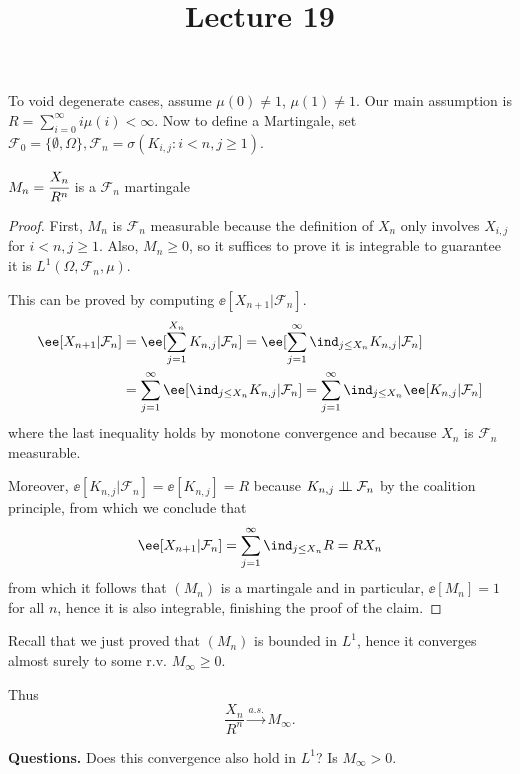 \documentclass[../main.tex]{subfiles}
\title{Lecture 19}
\begin{document}
\vspace{0.5em}
  To void degenerate cases, assume $\mu(0) \neq 1$, $\mu(1) \neq 1$. 
  Our main assumption is $R = \sum_{i=0}^\infty i\mu(i) < \infty$. 
  Now to define a Martingale, set $\mathcal{F}_0 = \{ \emptyset, \Omega \},
  \mathcal{F}_n = \sigma(K_{i,j} \colon i < n, j \geq 1)$.

  \begin{claim}
    $M_n = \cfrac{X_n}{R^n}$ is a $\mathcal{F}_n$ martingale
  \end{claim}
  \begin{proof}
      First, $M_n$ is $\mathcal{F}_n$ measurable because the definition of $X_n$
      only involves $X_{i, j}$ for $i < n, j \geq 1$. Also, $M_n \geq 0$, so it
      suffices to prove it is integrable to guarantee it is $L^1(\Omega,
      \mathcal{F}_n, \mu)$.

      This can be proved by computing $\ee[X_{n+1} | \mathcal{F}_n]$.
      \begin{align*}
        \ee[X_{n+1} | \mathcal{F}_n] &= \ee[\sum_{j=1}^{X_n} K_{n, j} |
      \mathcal{F}_n] = \ee[\sum_{j=1}^\infty \ind_{j \leq X_n} K_{n, j} |
      \mathcal{F}_n] \\
        &= \sum_{j=1}^\infty \ee[\ind_{j \leq X_n} K_{n, j} | \mathcal{F}_n]
        = \sum_{j=1}^{\infty} \ind_{j \leq X_n} \ee[K_{n, j} | \mathcal{F}_n]
      \end{align*}
      where the last inequality holds by monotone convergence and because $X_n$
      is $\mathcal{F}_n$ measurable.

      Moreover, $\ee[K_{n, j} | \mathcal{F}_n] = \ee[K_{n, j}] = R$ because
      $K_{n, j} \perp\!\!\!\!\,\perp \mathcal{F}_n$ by the coalition principle, from which we
      conclude that 
      \[
        \ee[X_{n+1} | \mathcal{F}_n] = \sum_{j=1}^\infty \ind_{j \leq X_n} R = R
        X_n
      \]
      from which it follows that $(M_n)$ is a martingale and in particular,
      $\ee[M_n] = 1$ for all $n$, hence it is also integrable, finishing the
      proof of the claim.
  \end{proof} 

  Recall that we just proved that $(M_n)$ is bounded in $L^1$, hence it
  converges almost surely to some r.v. $M_{\infty} \geq 0$. 

  Thus
  \[
  \frac{X_n}{R^n} \overset{a.s.}{\longrightarrow} M_{\infty}
  .\]
    
  \vspace{0.5em} \noindent
  \textbf{\sffamily Questions.}
  Does this convergence also hold in $L^1$? Is $M_{\infty} > 0$.
  \vspace{0.5em}
\end{document}
